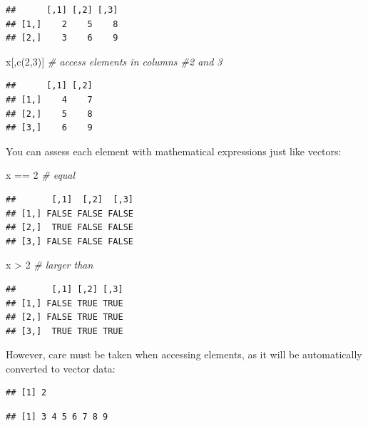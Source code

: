 \documentclass[
]{book}
\newenvironment{Shaded}{\begin{snugshade}}{\end{snugshade}}
\newcommand{\CommentTok}[1]{\textcolor[rgb]{0.56,0.35,0.01}{\textit{#1}}}
\newcommand{\DecValTok}[1]{\textcolor[rgb]{0.00,0.00,0.81}{#1}}
\newcommand{\FunctionTok}[1]{\textcolor[rgb]{0.00,0.00,0.00}{#1}}
\newcommand{\NormalTok}[1]{#1}
\newcommand{\SpecialCharTok}[1]{\textcolor[rgb]{0.00,0.00,0.00}{#1}}
\begin{document}
\begin{verbatim}
##      [,1] [,2] [,3]
## [1,]    2    5    8
## [2,]    3    6    9
\end{verbatim}

\begin{Shaded}
\begin{Highlighting}[]
\NormalTok{x[,}\FunctionTok{c}\NormalTok{(}\DecValTok{2}\NormalTok{,}\DecValTok{3}\NormalTok{)] }\CommentTok{\# access elements in columns \#2 and 3}
\end{Highlighting}
\end{Shaded}

\begin{verbatim}
##      [,1] [,2]
## [1,]    4    7
## [2,]    5    8
## [3,]    6    9
\end{verbatim}

You can assess each element with mathematical expressions just like vectors:

\begin{Shaded}
\begin{Highlighting}[]
\NormalTok{x }\SpecialCharTok{==} \DecValTok{2} \CommentTok{\# equal}
\end{Highlighting}
\end{Shaded}

\begin{verbatim}
##       [,1]  [,2]  [,3]
## [1,] FALSE FALSE FALSE
## [2,]  TRUE FALSE FALSE
## [3,] FALSE FALSE FALSE
\end{verbatim}

\begin{Shaded}
\begin{Highlighting}[]
\NormalTok{x }\SpecialCharTok{\textgreater{}} \DecValTok{2} \CommentTok{\# larger than}
\end{Highlighting}
\end{Shaded}

\begin{verbatim}
##       [,1] [,2] [,3]
## [1,] FALSE TRUE TRUE
## [2,] FALSE TRUE TRUE
## [3,]  TRUE TRUE TRUE
\end{verbatim}

However, care must be taken when accessing elements, as it will be automatically converted to vector data:

\begin{verbatim}
## [1] 2
\end{verbatim}

\begin{verbatim}
## [1] 3 4 5 6 7 8 9
\end{verbatim}
\end{document}
